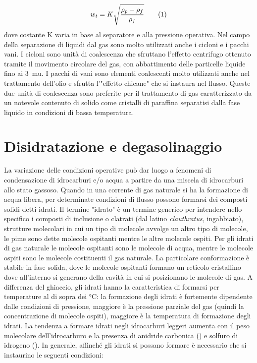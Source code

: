 \[ w_t=K \sqrt{\dfrac{\rho_p-\rho_f}{\rho_f}} \addtag \label{eq:rete}\]
dove costante K varia in base al separatore e alla pressione operativa.
Nel campo della separazione di liquidi dal gas sono molto utilizzati anche i cicloni e i pacchi vani. I cicloni sono unità di coalescenza che sfruttano l'effetto centrifugo ottenuto tramite il movimento circolare del gas, con abbattimento delle particelle liquide fino ai \SI{3}{mu}. I pacchi di vani sono elementi coalescenti molto utilizzati anche nel trattamento dell'olio e sfrutta l'"effetto chicane" che si instaura nel flusso. Queste due unità di coalescenza sono preferite per il trattamento di gas caratterizzato da un notevole contenuto di solido come cristalli di paraffina separatisi dalla fase liquido in condizioni di bassa temperatura.

\section{Disidratazione e degasolinaggio} \label{section:dehidratation}
La variazione delle condizioni operative può dar luogo a fenomeni di condensazione di idrocarburi e/o acqua a partire da una miscela di idrocarburi allo stato gassoso. Quando in una corrente di gas naturale si ha la formazione di acqua libera, per determinate condizioni di flusso possono formarsi dei composti solidi detti idrati.
Il termine "idrato" è un termine generico per intendere nello specifico i composti di inclusione o clatrati (dal latino \textit{clauthratus}, ingabbiato), strutture molecolari in cui un tipo di molecole avvolge un altro tipo di molecole, le pime sono dette molecole ospitanti mentre le altre molecole ospiti. Per gli idrati di gas naturale le molecole ospitanti sono le molecole di acqua, mentre le molecole ospiti sono le molecole costituenti il gas naturale. La particolare conformazione è stabile in fase solida, dove le molecole ospitanti formano un reticolo cristallino dove all'interno si generano della cavità in cui si posizionano le molecole di gas. 
A differenza del ghiaccio, gli idrati hanno la caratteristica di formarsi per temperature al di sopra dei °C: la formazione degli idrati è fortemente dipendente dalle condizioni di pressione, maggiore è la pressione parziale del gas (quindi la concentrazione di molecole ospiti), maggiore è la temperatura di formazione degli idrati. La tendenza a formare idrati negli idrocarburi leggeri aumenta con il peso molecolare dell'idrocarburo e la presenza di anidride carbonica () e solfuro di idrogeno (). 
In generale, affinché gli idrati si possano formare è necessario che si instaurino le seguenti condizioni:
